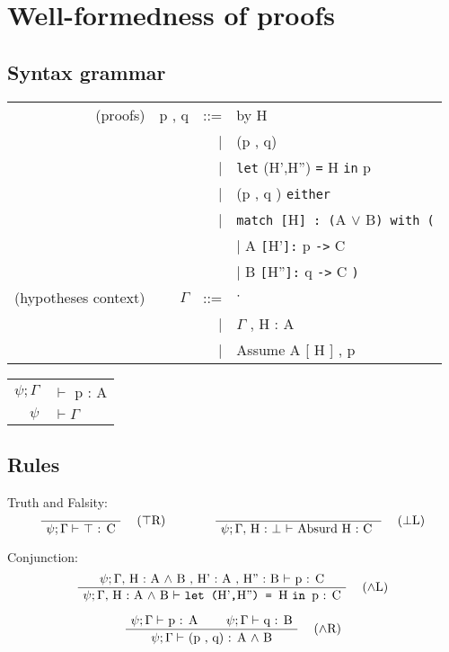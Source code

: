\documentclass[twoside,a4paper]{article}
\theoremstyle{definition}
\begin{document}
\section{Well-formedness of proofs}
\subsection{Syntax grammar}
\begin{center}
\begin{tabular}{rrrl}
(proofs)& p , q &::=& by H
\\ &&|& (p , q)
\\ &&|& {\tt let} (H',H'') {\tt =} H {\tt in} p
\\ &&|& (p , q ) {\tt either}
\\ &&|& {\tt match [}H{\tt  ] : (}A $\vee$ B{\tt ) with (}
\\ &&&\qquad \qquad | A {\tt [}H'{\tt ]:} p {\tt ->} C
\\ &&&\qquad \qquad | B {\tt [}H''{\tt ]:} q {\tt ->} C {\tt)}
\\
(hypotheses context)& $\Gamma$ &::=& \quad $\cdot$ \quad
\\ &&| & $\Gamma$ , H : A
\\ &&| & Assume A [ H ] , p
\end{tabular}

\begin{tabular} {rl}
$\psi ; \Gamma$ &$\vdash$ p : A
\\
$\psi $ & $\vdash \Gamma$
\end{tabular}
\end{center}

\subsection{Rules}
Truth and Falsity:
\[
\AxiomC{}
\RightLabel{\quad ($\top$R)}
\UnaryInfC{$\psi ; \Gamma \vdash$ $\top$ : C}
\DisplayProof
\qquad
\qquad
\AxiomC{}
\RightLabel{\quad ($\bot$L)}
\UnaryInfC{$\psi ; \Gamma ,$  H : $\bot$
$\vdash $
Absurd H : C
}
\DisplayProof
\]

Conjunction:
\[
\AxiomC{$\psi ; \Gamma ,$ H : A $\wedge$ B , H' : A , H'' : B
$\vdash$ p : C}
\RightLabel{\quad ($\wedge$L)}
\UnaryInfC{$\psi ; \Gamma ,$ H : A $\wedge$ B $\vdash$
{\tt let (}H'{\tt,}H''{\tt) = }H {\tt  in }p : C}
\DisplayProof
\]

\[
\AxiomC{$\psi ; \Gamma \vdash$ p : A}
\AxiomC{$\psi ; \Gamma \vdash$ q : B}
\RightLabel{\quad ($\wedge$R)}
\BinaryInfC{$\psi ; \Gamma \vdash$ (p , q) : A $\wedge$ B}
\DisplayProof
\]
\end{document}
